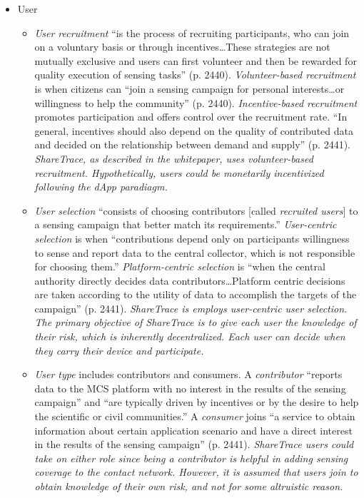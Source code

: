 \begin{itemize}
\begin{itemize}
\begin{itemize}
			\end{itemize}
		\item User
			\begin{itemize}
			\item \emph{User recruitment} ``is the process of recruiting participants, who can join on a voluntary basis or through incentives{\ldots}These strategies are not mutually exclusive and users can first volunteer and then be rewarded for quality execution of sensing tasks'' (p. 2440). \emph{Volunteer-based recruitment} is when citizens can ``join a sensing campaign for personal interests{\ldots}or willingness to help the community'' (p. 2440). \emph{Incentive-based recruitment} promotes participation and offers control over the recruitment rate. ``In general, incentives should also depend on the quality of contributed data and decided on the relationship between demand and supply'' (p. 2441). \emph{ShareTrace, as described in the whitepaper, uses volunteer-based recruitment. Hypothetically, users could be monetarily incentivized following the dApp paradiagm.}
			\item \emph{User selection} ``consists of choosing contributors [called \emph{recruited users}] to a sensing campaign that better match its requirements.'' \emph{User-centric selection} is when ``contributions depend only on participants willingness to sense and report data to the central collector, which is not responsible for choosing them.'' \emph{Platform-centric selection} is ``when the central authority directly decides data contributors{\ldots}Platform centric decisions are taken according to the utility of data to accomplish the targets of the campaign'' (p. 2441). \emph{ShareTrace is employs user-centric user selection. The primary objective of ShareTrace is to give each user the knowledge of their risk, which is inherently decentralized. Each user can decide when they carry their device and participate.}
			\item \emph{User type} includes contributors and consumers. A \emph{contributor} ``reports data to the MCS platform with no interest in the results of the sensing campaign'' and ``are typically driven by incentives or by the desire to help the scientific or civil communities.'' A \emph{consumer} joins ``a service to obtain information about certain application scenario and have a direct interest in the results of the sensing campaign'' (p. 2441). \emph{ShareTrace users could take on either role since being a contributor is helpful in adding sensing coverage to the contact network. However, it is assumed that users join to obtain knowledge of their own risk, and not for some altruistic reason.}

\end{itemize}
\end{itemize}
\end{itemize}
